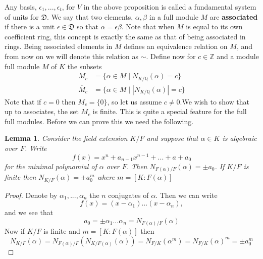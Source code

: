 \documentclass{article}
\newtheorem{lemma}{Lemma}[section]
\newcommand{\mfrak}[1]{\mathfrak{#1}}
\newcommand{\mbb}[1]{\mathbb{#1}}
\numberwithin{equation}{section}
\begin{document}
Any basis, $\epsilon_1, ..., \epsilon_t$, for $V$ in the above proposition is called a fundamental system of units for $\mfrak D$. We say that two elements, $\alpha,\beta$ in a full module $M$ are \textbf{associated} if there is a unit $\epsilon \in \mfrak D$ so that $\alpha = \epsilon \beta$. Note that when $M$ is equal to its own coefficient ring, this concept is exactly the same as that of being associated in rings. Being associated elements in $M$ defines an equivalence relation on $M$, and from now on we will denote this relation as $\sim$. Define now for $c \in \mbb Z$ and a module full module $M$ of $K$ the subsets
\begin{align*}
    M_c           & = \{ \alpha \in M \mid N_{K/\mbb Q}(\alpha) = c\}     \\
    \overline M_c & = \{ \alpha \in M \mid | N_{K /\mbb Q}(\alpha) | = c\}
\end{align*}
Note that if $c = 0$ then $M_c = \{ 0\}$, so let us assume $c \neq 0$.We wish to show that up to associates, the set $M_c$ is finite. This is quite a special feature for the full full modules. Before we can prove this we need the following.

\begin{lemma}\label{lem: norm of algebraic number is pm 0th coefficient}
    Consider the field extension $K / F$ and suppose that $\alpha \in K$ is algebraic over $F$. Write
    $$f(x) = x^n + a_{n-1} x^{n-1} + ... + a+a_0$$
    for the minimal polynomial of $\alpha$ over $F$. Then $N_{F(\alpha)/F} (\alpha) = \pm a_0$. If $K / F$ is finite then $N_{K / F}(\alpha) = \pm a_0^m$
    where $m = [K : F(\alpha)]$
\end{lemma}
\begin{proof}
    Denote by $\alpha_1, ..., \alpha_n$ the $n$ conjugates of $\alpha$. Then we can write
    $$f(x) = (x-\alpha_1)...(x-\alpha_n),$$
    and we see that
    $$a_0 = \pm \alpha_1 ... \alpha_n = N_{F(\alpha) / F}(\alpha)$$
    Now if $K/F$ is finite and $m = [K : F(\alpha)]$ then
    $$N_{K / F}(\alpha) = N_{F(\alpha) / F}(N_{K / F(\alpha)}(\alpha)) = N_{F / K}(\alpha^m) = N_{F / K}(\alpha)^m = \pm a_0^m$$
\end{proof}
\end{document}
